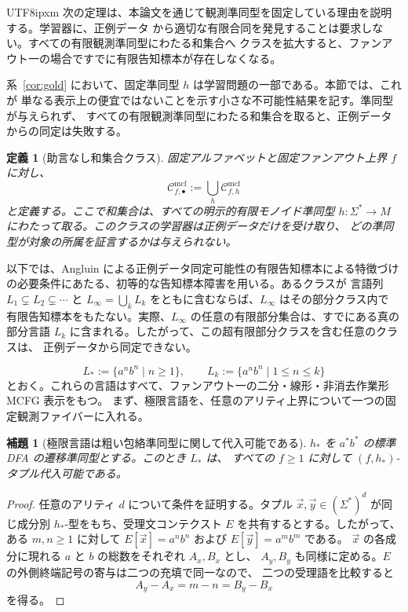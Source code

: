 \documentclass[10pt,a4paper]{article}
\newtheorem{lemma}[theorem]{補題}
\newtheorem{definition}[theorem]{定義}
\theoremstyle{remark}
\newcommand{\Cmcf}[2]{\mathcal{C}^{\mathrm{mcf}}_{#1,#2}}
\newcommand{\tuple}[1]{\vec{#1}}
\begin{document}
\begin{CJK}{UTF8}{ipxm}
次の定理は、本論文を通じて観測準同型を固定している理由を説明する。学習器に、正例データ
から適切な有限合同を発見することは要求しない。すべての有限観測準同型にわたる和集合へ
クラスを拡大すると、ファンアウト一の場合ですでに有限告知標本が存在しなくなる。

系~\ref{cor:gold} において、固定準同型 \(h\) は学習問題の一部である。本節では、これが
単なる表示上の便宜ではないことを示す小さな不可能性結果を記す。準同型が与えられず、
すべての有限観測準同型にわたる和集合を取ると、正例データからの同定は失敗する。

\begin{definition}[助言なし和集合クラス]
\label{def:no-advice-union}
固定アルファベットと固定ファンアウト上界 \(f\) に対し、
\[
  \Cmcf{f}{\bullet}:=\bigcup_h \Cmcf{f}{h}
\]
と定義する。ここで和集合は、すべての明示的有限モノイド準同型
\(h\colon\Sigma^*\to M\) にわたって取る。このクラスの学習器は正例データだけを受け取り、
どの準同型が対象の所属を証言するかは与えられない。
\end{definition}

以下では、Angluin による正例データ同定可能性の有限告知標本による特徴づけ
\cite{Angluin1980} の必要条件にあたる、初等的な告知標本障害を用いる。あるクラスが
言語列 \(L_1\subsetneq L_2\subsetneq\cdots\) と
\(L_\infty=\bigcup_k L_k\) をともに含むならば、\(L_\infty\) はその部分クラス内で
有限告知標本をもたない。実際、\(L_\infty\) の任意の有限部分集合は、すでにある真の
部分言語 \(L_k\) に含まれる。したがって、この超有限部分クラスを含む任意のクラスは、
正例データから同定できない。

\[
  L_*:=\{a^n b^n\mid n\ge1\},
  \qquad
  L_k:=\{a^n b^n\mid 1\le n\le k\}
\]
とおく。これらの言語はすべて、ファンアウト一の二分・線形・非消去作業形 MCFG 表示をもつ。
まず、極限言語を、任意のアリティ上界について一つの固定観測ファイバーに入れる。

\begin{lemma}[極限言語は粗い包絡準同型に関して代入可能である]
\label{lem:limit-ab-substitutable}
\(h_*\) を \(a^*b^*\) の標準 DFA の遷移準同型とする。このとき \(L_*\) は、
すべての \(f\ge1\) に対して \((f,h_*)\)-タプル代入可能である。
\end{lemma}

\begin{proof}
任意のアリティ \(d\) について条件を証明する。タプル
\(\tuple x,\tuple y\in(\Sigma^*)^d\) が同じ成分別 \(h_*\)-型をもち、受理文コンテクスト
\(E\) を共有するとする。したがって、ある \(m,n\ge1\) に対して
\(E[\tuple x]=a^n b^n\) および \(E[\tuple y]=a^m b^m\) である。
\(\tuple x\) の各成分に現れる \(a\) と \(b\) の総数をそれぞれ \(A_x,B_x\) とし、
\(A_y,B_y\) も同様に定める。\(E\) の外側終端記号の寄与は二つの充填で同一なので、
二つの受理語を比較すると
\[
  A_y-A_x=m-n=B_y-B_x
\]
を得る。


\end{proof}
\end{CJK}
\end{document}
